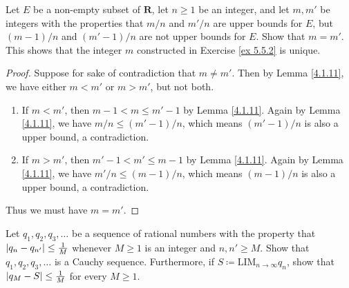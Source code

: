 \begin{exercise}\label{ex 5.5.3}
    Let \(E\) be a non-empty subset of \(\mathbf{R}\), let \(n \geq 1\) be an integer, and let \(m, m'\) be integers with the properties that \(m / n\) and \(m' / n\) are upper bounds for \(E\), but \((m - 1) / n\) and \((m' - 1) / n\) are not upper bounds for \(E\).
    Show that \(m = m'\).
    This shows that the integer \(m\) constructed in Exercise \ref{ex 5.5.2} is unique.
\end{exercise}

\begin{proof}
    Suppose for sake of contradiction that \(m \neq m'\).
    Then by Lemma \ref{4.1.11}, we have either \(m < m'\) or \(m > m'\), but not both.
    \begin{enumerate}
        \item If \(m < m'\), then \(m - 1 < m \leq m' - 1\) by Lemma \ref{4.1.11}.
              Again by Lemma \ref{4.1.11}, we have \(m / n \leq (m' - 1) / n\), which means \((m' - 1) / n\) is also a upper bound, a contradiction.
        \item If \(m > m'\), then \(m' - 1 < m' \leq m - 1\) by Lemma \ref{4.1.11}.
              Again by Lemma \ref{4.1.11}, we have \(m' / n \leq (m - 1) / n\), which means \((m - 1) / n\) is also a upper bound, a contradiction.
    \end{enumerate}
    Thus we must have \(m = m'\).
\end{proof}

\begin{exercise}\label{ex 5.5.4}
    Let \(q_1, q_2, q_3, \dots\) be a sequence of rational numbers with the property that \(\abs*{q_n - q_{n'}} \leq \frac{1}{M}\) whenever \(M \geq 1\) is an integer and \(n, n' \geq M\).
    Show that \(q_1, q_2, q_3, \dots\) is a Cauchy sequence.
    Furthermore, if \(S \coloneqq \text{LIM}_{n \to \infty} q_n\), show that \(\abs*{q_M - S} \leq \frac{1}{M}\) for every \(M \geq 1\).
\end{exercise}

